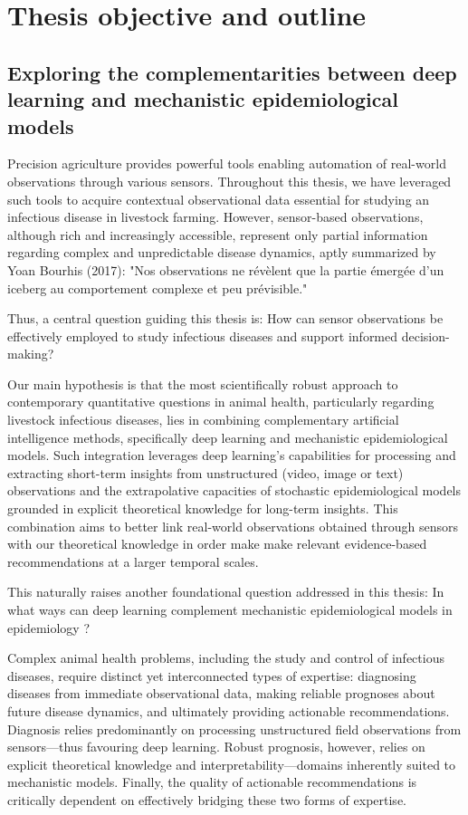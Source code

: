 \section{Thesis objective and outline}

\subsection{Exploring the complementarities between deep learning and mechanistic epidemiological models}

Precision agriculture provides powerful tools enabling automation of real-world observations through various sensors. Throughout this thesis, we have leveraged such tools to acquire contextual observational data essential for studying an infectious disease in livestock farming. However, sensor-based observations, although rich and increasingly accessible, represent only partial information regarding complex and unpredictable disease dynamics, aptly summarized by Yoan Bourhis (2017): "Nos observations ne révèlent que la partie émergée d’un iceberg au comportement complexe et peu prévisible."

Thus, a central question guiding this thesis is: How can sensor observations be effectively employed to study infectious diseases and support informed decision-making?

Our main hypothesis is that the most scientifically robust approach to contemporary quantitative questions in animal health, particularly regarding livestock infectious diseases, lies in combining complementary artificial intelligence methods, specifically deep learning and mechanistic epidemiological models. Such integration leverages deep learning’s capabilities for processing and extracting short-term insights from unstructured (video, image or text) observations  and the extrapolative capacities of stochastic epidemiological models grounded in explicit theoretical knowledge for long-term insights. This combination aims to better link real-world observations obtained through sensors with our theoretical knowledge in order make make relevant evidence-based recommendations at a larger temporal scales.

This naturally raises another foundational question addressed in this thesis:
In what ways can deep learning complement mechanistic epidemiological models in epidemiology ?

Complex animal health problems, including the study and control of infectious diseases, require distinct yet interconnected types of expertise: diagnosing diseases from immediate observational data, making reliable prognoses about future disease dynamics, and ultimately providing actionable recommendations. Diagnosis relies predominantly on processing unstructured field observations from sensors—thus favouring deep learning. Robust prognosis, however, relies on explicit theoretical knowledge and interpretability—domains inherently suited to mechanistic models. Finally, the quality of actionable recommendations is critically dependent on effectively bridging these two forms of expertise.

